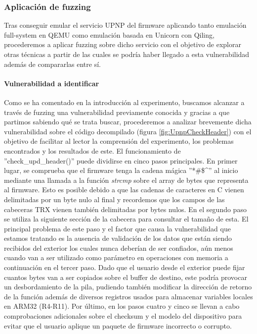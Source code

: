 \subsubsection{Aplicación de fuzzing}
Tras conseguir emular el servicio UPNP del firmware aplicando tanto emulación full-system en QEMU como emulación basada en Unicorn\cite{unicorn}
con Qiling\cite{qiling}, procederemos a aplicar fuzzing sobre dicho servicio con el objetivo de explorar otras técnicas a partir de las cuales 
se podría haber llegado a esta vulnerabilidad además de compararlas entre sí.

\paragraph{Vulnerabilidad a identificar} Como se ha comentado en la introducción al experimento, buscamos alcanzar a través de fuzzing una 
vulnerabilidad previamente conocida y gracias a que partimos sabiendo qué se trata buscar, procederemos a analizar brevemente dicha vulnerabilidad
sobre el código decompilado (figura \ref{fig:UpnpCheckHeader}) con el objetivo de facilitar al lector la comprensión del experimento, los problemas encontrados y los resultados de este. 
El funcionamiento de ''check\_upd\_header()'' puede dividirse en cinco pasos principales. En primer lugar, se comprueba que el firmware tenga 
la cadena mágica ''*\#\$\textasciicircum'' al inicio mediante una llamada a la función \textit{strcmp} sobre el array de bytes que representa al 
firmware. Esto es posible debido a que las cadenas de caracteres en C vienen delimitadas por un byte nulo al final y recordemos que los campos de 
las cabeceras TRX\cite{firmwareFormat} vienen también delimitadas por bytes nulos. En el segundo paso se utiliza la siguiente 
sección de la cabecera para consultar el tamaño de esta. El principal problema de este paso y el factor que causa la vulnerabilidad que estamos tratando
es la ausencia de validación de los datos que están siendo recibidos del exterior los cuales nunca deberían de ser confiados, aún menos cuando van a ser utilizado como parámetro en operaciones con memoria a continuación en el tercer paso. Dado que el usuario desde el exterior
puede fijar cuantos bytes van a ser copiados sobre el buffer de destino, este podría provocar un desbordamiento de la pila, pudiendo también modificar la 
dirección de retorno de la función además de diversos registros usados para almacenar variables locales en ARM32 (R4-R11). Por último, en los pasos 
cuatro y cinco se llevan a cabo comprobaciones adicionales sobre el checksum y el modelo del dispositivo para evitar que el usuario aplique un paquete
de firmware incorrecto o corrupto.


